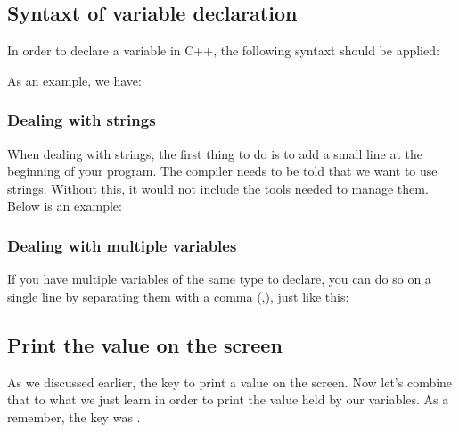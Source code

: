 \documentclass[11pt, a4paper]{article}
\begin{document}
\subsection{Syntaxt of variable declaration}
In order to declare a variable in C++, the following syntaxt should be applied:

As an example, we have:


\subsubsection{Dealing with strings}
When dealing with strings, the first thing to do is to add a small line at the beginning of your program.
The compiler needs to be told that we want to use strings. Without this, it
would not include the tools needed to manage them. Below is an example:


\subsubsection{Dealing with multiple variables}
If you have multiple variables of the same type to declare, you can do so on a single line
by separating them with a comma (,), just like this:


\subsection{Print the value on the screen}
As we discussed earlier, the key to print a value on the screen. Now let's combine that to
what we just learn in order to print the value held by our variables. As a remember, the key
was .
\end{document}
